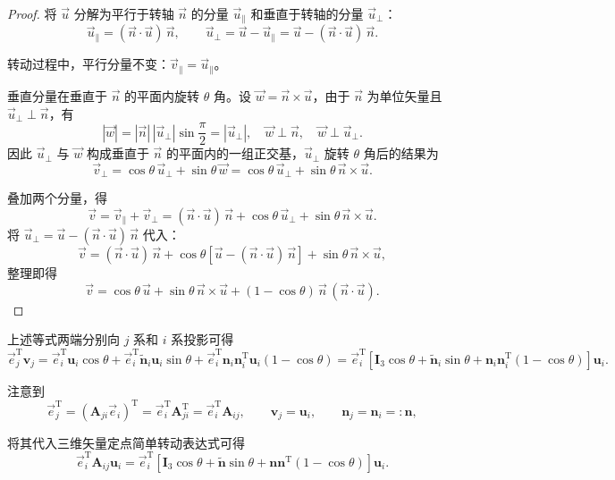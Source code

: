 \begin{proof}
	将 $\vec{u}$ 分解为平行于转轴 $\vec{n}$ 的分量 $\vec{u}_{\parallel}$ 和垂直于转轴的分量 $\vec{u}_{\perp}$：
	$$
	\vec{u}_{\parallel}=(\vec{n}\cdot\vec{u})\,\vec{n}, \qquad
	\vec{u}_{\perp}=\vec{u}-\vec{u}_{\parallel}=\vec{u}-(\vec{n}\cdot\vec{u})\,\vec{n}.
	$$

	转动过程中，平行分量不变：$\vec{v}_{\parallel}=\vec{u}_{\parallel}$。

	垂直分量在垂直于 $\vec{n}$ 的平面内旋转 $\theta$ 角。设 $\vec{w}=\vec{n}\times\vec{u}$，由于 $\vec{n}$ 为单位矢量且 $\vec{u}_{\perp}\perp\vec{n}$，有
	$$
	|\vec{w}|=|\vec{n}|\,|\vec{u}_{\perp}|\sin\frac{\pi}{2}=|\vec{u}_{\perp}|, \quad \vec{w}\perp\vec{n}, \quad \vec{w}\perp\vec{u}_{\perp}.
	$$
	因此 $\vec{u}_{\perp}$ 与 $\vec{w}$ 构成垂直于 $\vec{n}$ 的平面内的一组正交基，$\vec{u}_{\perp}$ 旋转 $\theta$ 角后的结果为
	$$
	\vec{v}_{\perp}=\cos\theta\,\vec{u}_{\perp}+\sin\theta\,\vec{w}
	=\cos\theta\,\vec{u}_{\perp}+\sin\theta\,\vec{n}\times\vec{u}.
	$$

	叠加两个分量，得
	$$
	\vec{v}=\vec{v}_{\parallel}+\vec{v}_{\perp}
	=(\vec{n}\cdot\vec{u})\,\vec{n}+\cos\theta\,\vec{u}_{\perp}+\sin\theta\,\vec{n}\times\vec{u}.
	$$
	将 $\vec{u}_{\perp}=\vec{u}-(\vec{n}\cdot\vec{u})\,\vec{n}$ 代入：
	$$
	\vec{v}=(\vec{n}\cdot\vec{u})\,\vec{n}+\cos\theta\left[\vec{u}-(\vec{n}\cdot\vec{u})\,\vec{n}\right]+\sin\theta\,\vec{n}\times\vec{u},
	$$
	整理即得
	$$
	\vec{v}=\cos\theta\,\vec{u}+\sin\theta\,\vec{n}\times\vec{u}+(1-\cos\theta)\,\vec{n}\,(\vec{n}\cdot\vec{u}).
	$$
\end{proof}

上述等式两端分别向 $j$ 系和 $i$ 系投影可得
$$
\vec{e}_j^{\mathrm{T}}\boldsymbol{v}_j
=\vec{e}_i^{\mathrm{T}}\boldsymbol{u}_i\cos\theta
+\vec{e}_i^{\mathrm{T}}\tilde{\boldsymbol{n}}_i\boldsymbol{u}_i\sin\theta
+\vec{e}_i^{\mathrm{T}}\boldsymbol{n}_i\boldsymbol{n}_i^{\mathrm{T}}\boldsymbol{u}_i(1-\cos\theta)
=\vec{e}_i^{\mathrm{T}}\left[\boldsymbol{I}_3\cos\theta+\tilde{\boldsymbol{n}}_i\sin\theta+\boldsymbol{n}_i\boldsymbol{n}_i^{\mathrm{T}}(1-\cos\theta)\right]\boldsymbol{u}_i.
$$

注意到
$$
\vec{e}_j^{\mathrm{T}}=(\boldsymbol{A}_{ji}\vec{e}_i)^{\mathrm{T}}=\vec{e}_i^{\mathrm{T}}\boldsymbol{A}_{ji}^{\mathrm{T}}=\vec{e}_i^{\mathrm{T}}\boldsymbol{A}_{ij},\qquad\boldsymbol{v}_j=\boldsymbol{u}_i,\qquad\boldsymbol{n}_j=\boldsymbol{n}_i=:\boldsymbol{n},
$$

将其代入三维矢量定点简单转动表达式可得
$$
\vec{e}_i^{\mathrm{T}}\boldsymbol{A}_{ij}\boldsymbol{u}_i=\vec{e}_i^{\mathrm{T}}\left[\boldsymbol{I}_3\cos\theta+\tilde{\boldsymbol{n}}\sin\theta+\boldsymbol{n}\boldsymbol{n}^{\mathrm{T}}(1-\cos\theta)\right]\boldsymbol{u}_i.
$$

